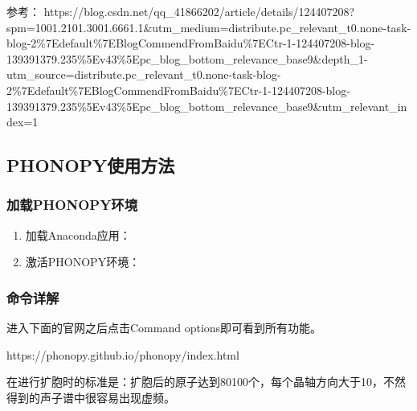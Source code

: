 







参考：
https://blog.csdn.net/qq\_41866202/article/details/124407208?spm=1001.2101.3001.6661.1\&utm\_medium=distribute.pc\_relevant\_t0.none-task-blog-2\%7Edefault\%7EBlogCommendFromBaidu\%7ECtr-1-124407208-blog-139391379.235\%5Ev43\%5Epc\_blog\_bottom\_relevance\_base9\&depth\_1-utm\_source=distribute.pc\_relevant\_t0.none-task-blog-2\%7Edefault\%7EBlogCommendFromBaidu\%7ECtr-1-124407208-blog-139391379.235\%5Ev43\%5Epc\_blog\_bottom\_relevance\_base9\&utm\_relevant\_index=1

\subsection{PHONOPY使用方法}\label{subsec:计算软件PHONOPY-PHONOPY使用方法}

\subsubsection{加载PHONOPY环境}
\begin{enumerate}
    \item 加载Anaconda应用：
    \item 激活PHONOPY环境：
\end{enumerate}

\subsubsection{命令详解}

进入下面的官网之后点击Command options即可看到所有功能。

https://phonopy.github.io/phonopy/index.html 

\begin{attention}
 在进行扩胞时的标准是：扩胞后的原子达到80\ttilde100个，每个晶轴方向大于10，不然得到的声子谱中很容易出现虚频。
\end{attention}